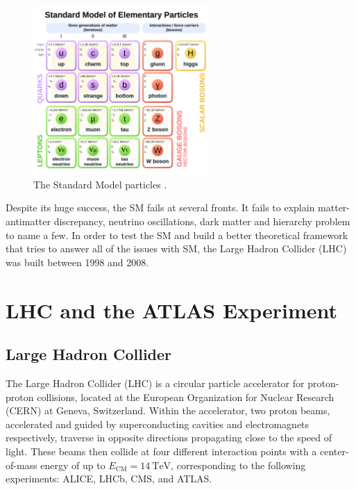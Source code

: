 \documentclass[a4paper]{report}
\numberwithin{equation}{section}
\begin{document}
\begin{figure}[htpb]
    \centering
    \includegraphics[width=0.6\textwidth]{sm.svg.png}
    \caption{The Standard Model particles \cite{wiki:xxx}.}
    \label{fig:sm}
\end{figure}

Despite its huge success, the SM fails at several fronts. It fails to explain matter-antimatter discrepancy, neutrino oscillations, dark matter and hierarchy problem to name a few. In order to test the SM and build a better theoretical framework that tries to answer all of the issues with SM, the Large Hadron Collider (LHC) was built between 1998 and 2008. 

\section{LHC and the ATLAS Experiment} \label{sec:lhc_and_atlas}

\subsection{Large Hadron Collider}

The Large Hadron Collider (LHC) is a circular particle accelerator for proton-proton collisions, located at the European Organization 
for Nuclear Research (CERN) at Geneva, Switzerland. Within the accelerator, two proton beams, accelerated and guided by superconducting 
cavities and electromagnets respectively, traverse in opposite directions propagating close to the speed of light. These beams then 
collide at four different interaction points with a center-of-mass energy of up to $E_{\mathrm{CM}} = \SI{14}{\tera\electronvolt}$,
 corresponding to the following experiments: ALICE, LHCb, CMS, and ATLAS. \par
\end{document}
